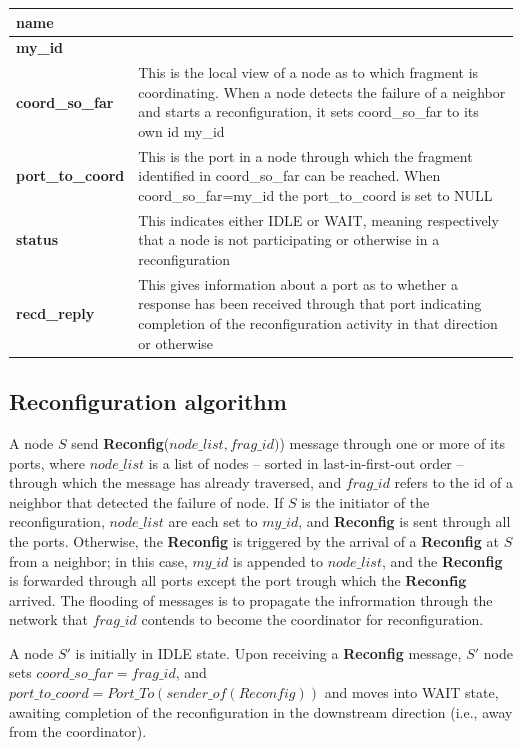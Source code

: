 \documentclass[a4paper,12pt]{article}
\newcommand{\<}{\langle}
\renewcommand{\>}{\rangle}
\theoremstyle{definition}
\begin{document}
\begin{table}[]
\begin{tabular}{|l|l|}
\hline
\textbf{name} &  \\ \hline
\textbf{my\_id} &  \\ \hline
\textbf{coord\_so\_far} & This is the local view of a node as to which fragment is coordinating. When a node detects the failure of a neighbor and starts a reconfiguration, it sets coord\_so\_far to its own id my\_id \\ \hline 
\textbf{port\_to\_coord} & This is the port in a node through which the fragment identified in coord\_so\_far can be reached. When coord\_so\_far=my\_id the port\_to\_coord is set to NULL \\ \hline
\textbf{status} & This indicates either IDLE or WAIT, meaning respectively that a node is not participating or otherwise in a reconfiguration \\ \hline
\textbf{recd\_reply} &  This gives information about a port as to whether a response has been received through that port indicating completion of the reconfiguration activity in that direction or otherwise \\ \hline 
\end{tabular}
\end{table}

\subsection{Reconfiguration algorithm}

A node $S$ send \textbf{Reconfig}($node\_list, frag\_id)$) message through one or more of its ports, where $node\_list$ is a list of nodes -- sorted in last-in-first-out order -- through which the message has already traversed, and $frag\_id$ refers to the id of a neighbor that detected the failure of node. If $S$ is the initiator of the reconfiguration, $node\_list$ are each set to $my\_id$, and \textbf{Reconfig} is sent through all the ports. Otherwise, the \textbf{Reconfig} is triggered by the arrival of a \textbf{Reconfig} at $S$ from a neighbor; in this case, $my\_id$ is appended to $node\_list$, and the \textbf{Reconfig} is forwarded through all ports except the port trough which the $\textbf{Reconfig}$ arrived. The flooding of messages is to propagate the infrormation through the network that $frag\_id$ contends to become the coordinator for reconfiguration. 

A node $S'$ is initially in IDLE state. Upon receiving a \textbf{Reconfig} message, $S'$ node sets $coord\_so\_far=frag\_id$, and $port\_to\_coord=Port\_To(sender\_of(Reconfig))$ and moves into WAIT state, awaiting completion of the reconfiguration in the downstream direction (i.e., away from the coordinator). 
\end{document}
